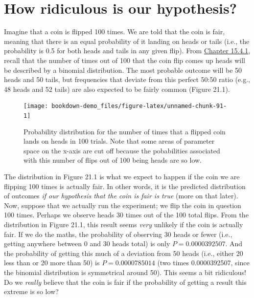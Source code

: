 \documentclass[
]{scrbook}
\begin{document}
\hypertarget{how-ridiculous-is-our-hypothesis}{%
\section{How ridiculous is our hypothesis?}\label{how-ridiculous-is-our-hypothesis}}

Imagine that a coin is flipped 100 times.
We are told that the coin is fair, meaning that there is an equal probability of it landing on heads or tails (i.e., the probability is 0.5 for both heads and tails in any given flip).
From \protect\hyperlink{Chapter_15.htmlux5cux23binomial-distribution}{Chapter 15.4.1}, recall that the number of times out of 100 that the coin flip comes up heads will be described by a binomial distribution.
The most probable outcome will be 50 heads and 50 tails, but frequencies that deviate from this perfect 50:50 ratio (e.g., 48 heads and 52 tails) are also expected to be fairly common (Figure 21.1).

\begin{figure}
\texttt{[image: bookdown-demo\_files/figure-latex/unnamed-chunk-91-1]} \caption{Probability distribution for the number of times that a flipped coin lands on heads in 100 trials. Note that some areas of parameter space on the x-axis are cut off because the pobabilities associated with this number of flips out of 100 being heads are so low.}\label{fig:unnamed-chunk-91}
\end{figure}

The distribution in Figure 21.1 is what we expect to happen if the coin we are flipping 100 times is actually fair.
In other words, it is the predicted distribution of outcomes \emph{if our hypothesis that the coin is fair is true} (more on that later).
Now, suppose that we actually run the experiment; we flip the coin in question 100 times.
Perhaps we observe heads 30 times out of the 100 total flips.
From the distribution in Figure 21.1, this result seems \emph{very} unlikely if the coin is actually fair.
If we do the maths, the probability of observing 30 heads or fewer (i.e., getting anywhere between 0 and 30 heads total) is only \(P = 0.0000392507\).
And the probability of getting this much of a deviation from 50 heads (i.e., either 20 less than or 20 more than 50) is \(P = 0.0000785014\) (two times 0.0000392507, since the binomial distribution is symmetrical around 50).
This seems a bit ridiculous!
Do we \emph{really} believe that the coin is fair if the probability of getting a result this extreme is so low?
\end{document}
